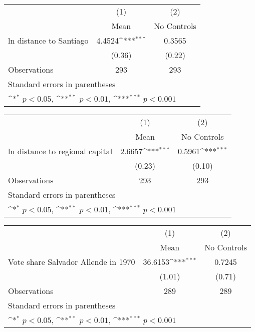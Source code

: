{
\def\sym#1{\ifmmode^{#1}\else\(^{#1}\)\fi}
\begin{tabular}{l*{2}{c}}
\hline\hline
                    &\multicolumn{1}{c}{(1)}&\multicolumn{1}{c}{(2)}\\
                    &\multicolumn{1}{c}{Mean}&\multicolumn{1}{c}{No Controls}\\
\hline
ln distance to Santiago&      4.4524\sym{***}&      0.3565         \\
                    &      (0.36)         &      (0.22)         \\
\hline
Observations        &         293         &         293         \\
\hline\hline
\multicolumn{3}{l}{\footnotesize Standard errors in parentheses}\\
\multicolumn{3}{l}{\footnotesize \sym{*} \(p<0.05\), \sym{**} \(p<0.01\), \sym{***} \(p<0.001\)}\\
\end{tabular}
}
{
\def\sym#1{\ifmmode^{#1}\else\(^{#1}\)\fi}
\begin{tabular}{l*{2}{c}}
\hline\hline
                    &\multicolumn{1}{c}{(1)}&\multicolumn{1}{c}{(2)}\\
                    &\multicolumn{1}{c}{Mean}&\multicolumn{1}{c}{No Controls}\\
\hline
ln distance to regional capital&      2.6657\sym{***}&      0.5961\sym{***}\\
                    &      (0.23)         &      (0.10)         \\
\hline
Observations        &         293         &         293         \\
\hline\hline
\multicolumn{3}{l}{\footnotesize Standard errors in parentheses}\\
\multicolumn{3}{l}{\footnotesize \sym{*} \(p<0.05\), \sym{**} \(p<0.01\), \sym{***} \(p<0.001\)}\\
\end{tabular}
}
{
\def\sym#1{\ifmmode^{#1}\else\(^{#1}\)\fi}
\begin{tabular}{l*{2}{c}}
\hline\hline
                    &\multicolumn{1}{c}{(1)}&\multicolumn{1}{c}{(2)}\\
                    &\multicolumn{1}{c}{Mean}&\multicolumn{1}{c}{No Controls}\\
\hline
Vote share Salvador Allende in 1970&     36.6153\sym{***}&      0.7245         \\
                    &      (1.01)         &      (0.71)         \\
\hline
Observations        &         289         &         289         \\
\hline\hline
\multicolumn{3}{l}{\footnotesize Standard errors in parentheses}\\
\multicolumn{3}{l}{\footnotesize \sym{*} \(p<0.05\), \sym{**} \(p<0.01\), \sym{***} \(p<0.001\)}\\
\end{tabular}
}

